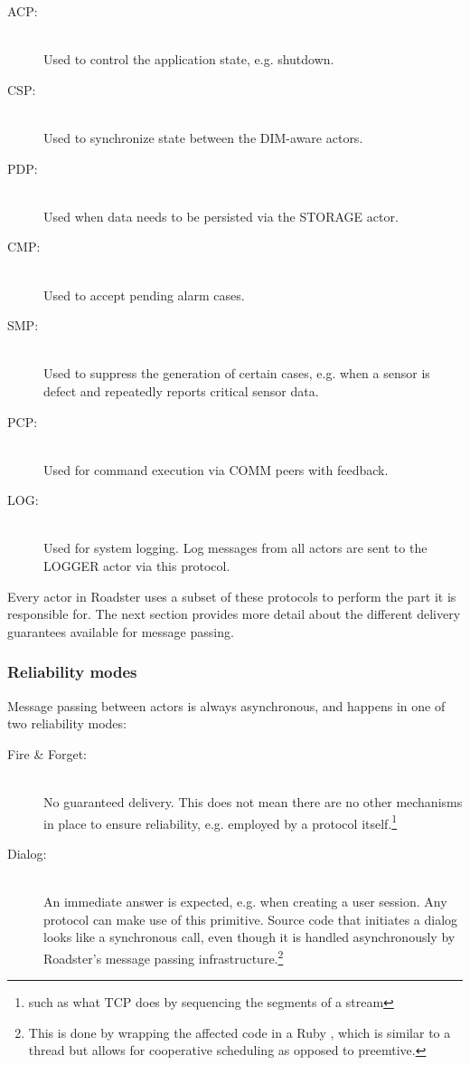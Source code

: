 \begin{description}
	\item [\gls{ACP}:]\hfill\\
		Used to control the application state, e.g. shutdown.
	\item [\gls{CSP}:]\hfill\\
		Used to synchronize state between the DIM-aware actors.
	\item [\gls{PDP}:]\hfill\\
		Used when data needs to be persisted via the STORAGE actor.
	\item [\gls{CMP}:]\hfill\\
		Used to accept pending alarm cases.
	\item [\gls{SMP}:]\hfill\\
		Used to suppress the generation of certain \glspl{case}, e.g.
		when a sensor is defect and repeatedly reports critical sensor data.
	\item [\gls{PCP}:]\hfill\\
		Used for command execution via COMM peers with feedback.
	\item [\gls{LOG}:]\hfill\\
		Used for system logging. Log messages from all actors are sent
		to the LOGGER actor via this protocol.
\end{description}

Every actor in Roadster uses a subset of these protocols to perform the part it
is responsible for. The next section provides more detail about the different
delivery guarantees available for message passing.

\subsubsection{Reliability modes}
Message passing between actors is always asynchronous, and happens in one of
two reliability modes:

\begin{description}
\item [Fire \& Forget:]\hfill\\
No guaranteed delivery. This does not mean there are no other mechanisms in
place to ensure reliability, e.g. employed by a protocol itself.\footnote{such
as what \gls{TCP} does by sequencing the segments of a stream}

\item [Dialog:]\hfill\\
An immediate answer is expected, e.g. when creating a user
session. Any protocol can make use of this primitive. Source code that
initiates a dialog looks like a synchronous call, even though
it is handled asynchronously by Roadster's message passing
infrastructure.\footnote{This is done by wrapping the affected
code in a Ruby , which is similar to a thread but
allows for cooperative scheduling as opposed to preemtive.}
\end{description}


